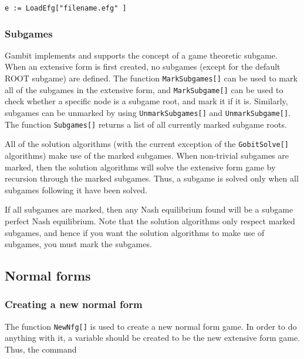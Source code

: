 \begin{verbatim}
e := LoadEfg["filename.efg" ]
\end{verbatim}

\subsubsection{Subgames}

Gambit implements and supports the concept of a game theoretic
subgame.  When an extensive form is first created, no subgames (except
for the default ROOT subgame) are defined.  The function
\verb+MarkSubgames[]+ can be used to mark all of the subgames in the
extensive form, and \verb+MarkSubgame[]+ can be used to check whether
a specific node is a subgame root, and mark it if it is.  Similarly,
subgames can be unmarked by using \verb+UnmarkSubgames[]+ and
\verb+UnmarkSubgame[]+.  The function \verb+Subgames[]+ returns a list
of all currently marked subgame roots.

All of the solution algorithms (with the current exception of the
\verb+GobitSolve[]+ algorithms) make use of the marked subgames.  When
non-trivial subgames are marked, then the solution algorithms will
solve the extensive form game by recursion through the marked
subgames.  Thus, a subgame is solved only when all subgames following
it have been solved.

If all subgames are marked, then any Nash equilibrium found will be a
subgame perfect Nash equilibrium.  Note that the solution algorithms
only respect marked subgames, and hence if you want the solution
algorithms to make use of subgames, you must mark the subgames.


\subsection{Normal forms}

\subsubsection{Creating a new normal form}

The function \verb+NewNfg[]+ is used to create a new normal form game.
In order to do anything with it, a variable should be created to be
the new extensive form game.  Thus, the command

